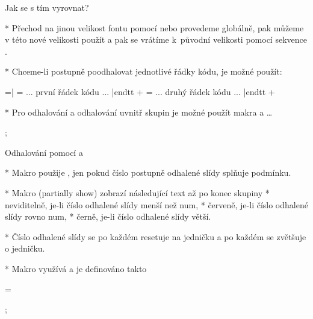 \secc Jak se s tím vyrovnat?

* Přechod na jinou velikost fontu pomocí \code{\\typosize} nebo
  \code{\\typoscale} provedeme
  globálně, pak můžeme v této nové velikosti použít \code{\\pg+} a pak se
  vrátíme k~původní velikosti pomocí sekvence \code{\\normalsize}.

* Chceme-li postupně poodhalovat jednotlivé řádky kódu, je možné použít:

\pg=\typosize[13/15]\adef|{\bslash}\begtt
\pg=\begtt
... první řádek kódu ...
|endtt \pg+ \pg=\begtt
... druhý řádek kódu ...
|endtt \pg+
\endtt

* Pro odhalování  a odhalování uvnitř skupin
  je možné použít makra \code{\\use} a \code{\\pshow}\dots

\pg; %

\sec Odhalování pomocí \code{\\use} a \code{\\pshow}

* Makro  použije \code{\\povel}, jen pokud číslo
  postupně odhalené slídy splňuje podmínku. 

* Makro  (partially show) zobrazí následující text 
  až po konec skupiny
\begitems
* neviditelně, je-li číslo odhalené slídy menší než num,
* červeně, je-li číslo odhalené slídy rovno num,
* černě, je-li číslo odhalené slídy větší. 
\enditems

* Číslo odhalené slídy se po každém \code{\\pg;} resetuje na jedničku a po
  každém \code{\\pg+} se zvětšuje o jedničku.

* Makro \code{\\pshow} využívá \code{\\use} a je definováno takto

\pg=\begtt
\def\pshow#1{\use{=#1}\Red \use{<#1}\White \ignorespaces}
\endtt


\edef\restore{\leftskip=\the\leftskip \relax}

\pg; %

